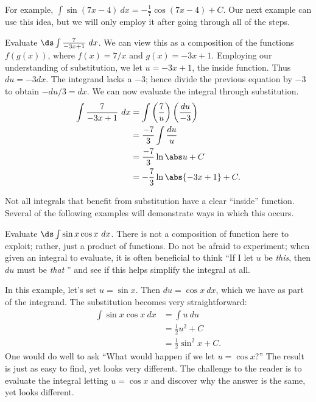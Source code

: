 For example, $\int \sin (7x-4)\ dx = -\frac17\cos(7x-4)+C$. Our next example can use this idea, but we will only employ it after going through all of the steps.

\begin{example}\label{ex_sub3}
Evaluate $\ds \int \frac{7}{-3x+1}\ dx$.
\solution
We can view this as a composition of the functions $f(g(x))$, where $f(x) = 7/x$ and $g(x) = -3x+1$. Employing our understanding of substitution, we let $u = -3x+1$, the inside function. Thus $du = -3dx$. The integrand lacks a $-3$; hence divide the previous equation by $-3$ to obtain $-du/3 = dx$. We can now evaluate the integral through substitution.
\begin{align*}
	\int \frac{7}{-3x+1}\ dx
	&= \int\left(\frac{7}{u}\right)\left(\frac{du}{-3}\right) \\
	&= \frac{-7}3\int \frac{du}{u} \\
	&= \frac{-7}3\ln \abs u + C\\
	&= -\frac73\ln\abs{-3x+1} + C.
\end{align*}
\end{example}

Not all integrals that benefit from substitution have a clear ``inside'' function. Several of the following examples will demonstrate ways in which this occurs.

\begin{example}\label{ex_sub10}
Evaluate $\ds \int \sin x\cos x\ dx$.
\solution
There is not a composition of function here to exploit; rather, just a product of functions. Do not be afraid to experiment; when given an integral to evaluate, it is often beneficial to think ``If I let $u$ be \emph{this}, then $du$ must be \emph{that} \dotso'' and see if this helps simplify the integral at all.

In this example, let's set $u = \sin x$. Then $du = \cos x\ dx$, which we have as part of the integrand. The substitution becomes very straightforward:
\begin{align*}
	\int \sin x\cos x\ dx
	&=	\int u\ du \\
	&= \frac12u^2+ C \\
	&= \frac12\sin^2 x + C.
\end{align*}
One would do well to ask ``What would happen if we let $u = \cos x$?'' The result is just as easy to find, yet looks very different. The challenge to the reader is to evaluate the integral letting $u = \cos x$ and discover why the answer is the same, yet looks different.
\end{example}

